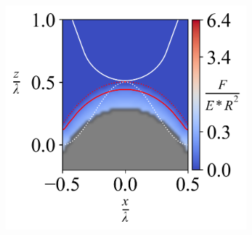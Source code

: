 \begin{figure}[H]
\begin{subfigure}[t]{0.34\textwidth}
    \end{subfigure}
    \hfill
    \begin{subfigure}[t]{0.34\textwidth}
        \centering
        \caption{\label{fig: Wave-ContourPlot-7} }
        \includegraphics[width=1\linewidth]{Figures/Wave-ContourPlot-7.png}
    \end{subfigure}

    
     \hfill
    \vspace{-0.3in}


\end{figure}
